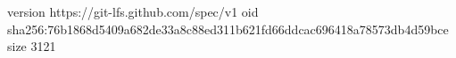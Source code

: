 version https://git-lfs.github.com/spec/v1
oid sha256:76b1868d5409a682de33a8c88ed311b621fd66ddcac696418a78573db4d59bce
size 3121
